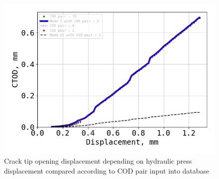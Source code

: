 \begin{figure}[th]
	\centering
	\includegraphics[scale=0.4]{Figures/CODpairchos}
	\caption[Crack tip opening displacement depending on COD pair input]{Crack tip opening displacement depending on hydraulic press displacement compared according to COD pair input into database}
	\label{fig:CODpairchos}
\end{figure}

